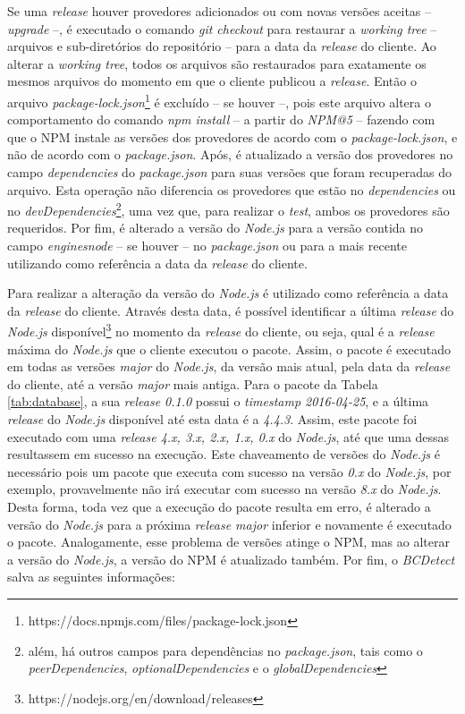 Se uma \textit{release} houver provedores adicionados ou com novas versões aceitas -- \textit{upgrade} --, é executado o comando \textit{git checkout} para restaurar a \textit{working tree} -- arquivos e sub-diretórios do repositório -- para a data da \textit{release} do cliente. Ao alterar a \textit{working tree}, todos os arquivos são restaurados para exatamente os mesmos arquivos do momento em que o cliente publicou a \textit{release}. Então o arquivo \textit{package-lock.json}\footnote{https://docs.npmjs.com/files/package-lock.json} é excluído -- se houver --, pois este arquivo altera o comportamento do comando \textit{npm install} -- a partir do \textit{NPM@5} -- fazendo com que o \gls{NPM} instale as versões dos provedores de acordo com o \textit{package-lock.json}, e não de acordo com o \textit{package.json}. Após, é atualizado a versão dos provedores no campo \textit{dependencies} do \textit{package.json} para suas versões que foram recuperadas do arquivo. Esta operação não diferencia os provedores que estão no \textit{dependencies} ou no \textit{devDependencies}\footnote{além, há outros campos para dependências no \textit{package.json}, tais como o \textit{peerDependencies}, \textit{optionalDependencies} e o \textit{globalDependencies}}, uma vez que, para realizar o \textit{test}, ambos os provedores são requeridos. Por fim, é alterado a versão do \textit{Node.js} para a versão contida no campo \textit{engines\textrightarrow node} -- se houver -- no \textit{package.json} ou para a mais recente utilizando como referência a data da \textit{release} do cliente.

Para realizar a alteração da versão do \textit{Node.js} é utilizado como referência a data da \textit{release} do cliente. Através desta data, é possível identificar a última \textit{release} do \textit{Node.js} disponível\footnote{https://nodejs.org/en/download/releases} no momento da \textit{release} do cliente, ou seja, qual é a \textit{release} máxima do \textit{Node.js} que o cliente executou o pacote. Assim, o pacote é executado em todas as versões \textit{major} do \textit{Node.js}, da versão mais atual, pela data da \textit{release} do cliente, até a versão \textit{major} mais antiga. Para o pacote da Tabela \ref{tab:database}, a sua \textit{release 0.1.0} possui o \textit{timestamp 2016-04-25}, e a última \textit{release} do \textit{Node.js} disponível até esta data é a \textit{4.4.3}. Assim, este pacote foi executado com uma \textit{release 4.x, 3.x, 2.x, 1.x, 0.x} do \textit{Node.js}, até que uma dessas resultassem em sucesso na execução. Este chaveamento de versões do \textit{Node.js} é necessário pois um pacote que executa com sucesso na versão \textit{0.x} do \textit{Node.js}, por exemplo, provavelmente não irá executar com sucesso na versão \textit{8.x} do \textit{Node.js}. Desta forma, toda vez que a execução do pacote resulta em erro, é alterado a versão do \textit{Node.js} para a próxima \textit{release major} inferior e novamente é executado o pacote. Analogamente, esse problema de versões atinge o \gls{NPM}, mas ao alterar a versão do \textit{Node.js}, a versão do \gls{NPM} é atualizado também. Por fim, o \textit{BCDetect} salva as seguintes informações:

